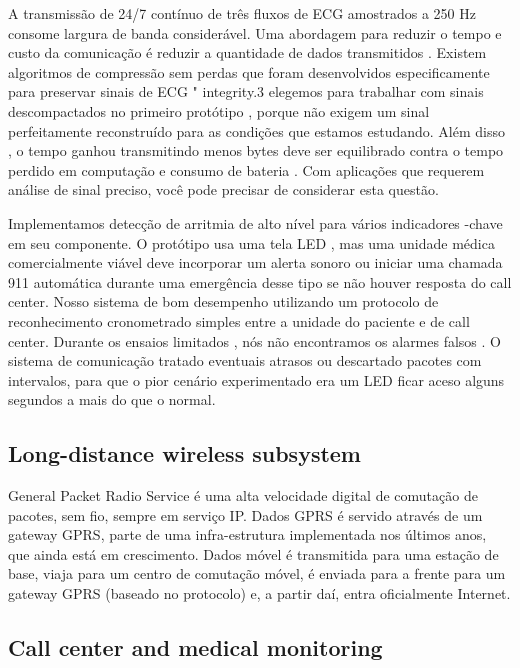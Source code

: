 \documentclass[12pt]{article} %
\begin{document}
A transmissão de 24/7 contínuo de três fluxos de ECG amostrados a 250 Hz consome largura de banda considerável. Uma abordagem para reduzir o tempo e custo da comunicação é reduzir a quantidade de dados transmitidos . Existem algoritmos de compressão sem perdas que foram desenvolvidos especificamente para preservar sinais de ECG " integrity.3 elegemos para trabalhar com sinais descompactados no primeiro protótipo , porque não exigem um sinal perfeitamente reconstruído para as condições que estamos estudando. Além disso , o tempo ganhou transmitindo menos bytes deve ser equilibrado contra o tempo perdido em computação e consumo de bateria . Com aplicações que requerem análise de sinal preciso, você pode precisar de considerar esta questão.

Implementamos detecção de arritmia de alto nível para vários indicadores -chave em seu componente. O protótipo usa uma tela LED , mas uma unidade médica comercialmente viável deve incorporar um alerta sonoro ou iniciar uma chamada 911 automática durante uma emergência desse tipo se não houver resposta do call center. Nosso sistema de bom desempenho utilizando um protocolo de reconhecimento cronometrado simples entre a unidade do paciente e de call center. Durante os ensaios limitados , nós não encontramos os alarmes falsos . O sistema de comunicação tratado eventuais atrasos ou descartado pacotes com intervalos, para que o pior cenário experimentado era um LED ficar aceso alguns segundos a mais do que o normal.


\subsection{Long-distance wireless subsystem} %

General Packet Radio Service é uma alta velocidade digital de comutação de pacotes, sem fio, sempre em serviço IP. Dados GPRS é servido através de um gateway GPRS, parte de uma infra-estrutura implementada nos últimos anos, que ainda está em crescimento. Dados móvel é transmitida para uma estação de base, viaja para um centro de comutação móvel, é enviada para a frente para um gateway GPRS (baseado no protocolo) e, a partir daí, entra oficialmente Internet.


\subsection{Call center and medical monitoring} %
\end{document}

